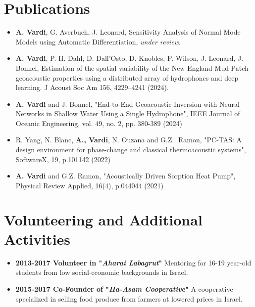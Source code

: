 \documentclass[letterpaper,11pt]{article}
\begin{document}
\section{Publications}
\begin{itemize}[leftmargin=0.15in, label={}]
	\item \textbf{A. Vardi}, G. Averbuch, J. Leonard, Sensitivity Analysis of Normal Mode Models using Automatic Differentiation, \emph{under review}.
	\item \textbf{A. Vardi}, P. H. Dahl, D. Dall’Osto, D. Knobles, P. Wilson, J. Leonard, J. Bonnel, Estimation of the spatial variability of the New England Mud Patch geoacoustic properties using a distributed array of hydrophones and deep learning. J Acoust Soc Am 156, 4229–4241 (2024).
	\item \textbf{A. Vardi} and J. Bonnel, "End-to-End Geoacoustic Inversion with Neural Networks in Shallow Water Using a Single Hydrophone", IEEE Journal of Oceanic Engineering, vol. 49, no. 2, pp. 380-389 (2024)
	\item R. Yang, N. Blanc, \textbf{A., Vardi}, N. Ouzana and G.Z.. Ramon, "PC-TAS: A design environment for phase-change and classical thermoacoustic systems", SoftwareX, 19, p.101142 (2022)

	\item \textbf{A. Vardi} and G.Z. Ramon, "Acoustically Driven Sorption Heat Pump", Physical Review Applied, 16(4), p.044044 (2021)

\end{itemize}

\section{Volunteering and Additional Activities}
\begin{itemize}[leftmargin=0.15in, label={}]
	\item{\textbf{2013-2017 Volunteer in "\textit{Aharai Labagrut}" }{Mentoring for 16-19 year-old students from low social-economic backgrounds in Israel.}}
	\item{\textbf{2015-2017 Co-Founder of "\textit{Ha-Asam Cooperative}"}{ A cooperative specialized in selling food produce from farmers at lowered prices in Israel.}}
\end{itemize}


\end{document}

